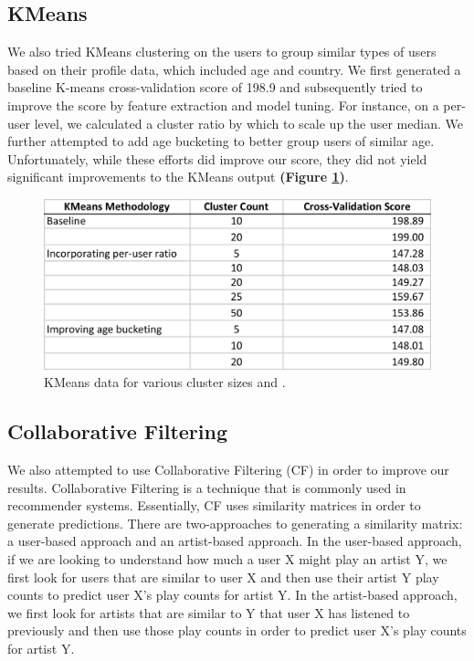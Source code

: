 \documentclass[11pt]{article}
\begin{document}
\subsection{KMeans}
We also tried KMeans clustering on the users to group similar types of users based on their profile data, which included age and country. We first generated a baseline K-means cross-validation score of 198.9 and subsequently tried to improve the score by feature extraction and model tuning. For instance, on a per-user level, we calculated a cluster ratio by which to scale up the user median. We further attempted to add age bucketing to better group users of similar age. Unfortunately, while these efforts did improve our score, they did not yield significant improvements to the KMeans output {\bf (Figure \ref{fig:kmeans_table})}.

 \begin{figure}[t]
    \centering
    \includegraphics[width=12cm]{kmeans_table}
    \caption{KMeans data for various cluster sizes and .}
    \label{fig:kmeans_table}
\end{figure}


\subsection{Collaborative Filtering}
We also attempted to use Collaborative Filtering (CF) in order to improve our results. Collaborative Filtering is a technique that is commonly used in recommender systems. Essentially, CF uses similarity matrices in order to generate predictions. There are two-approaches to generating a similarity matrix: a user-based approach and an artist-based approach. In the user-based approach, if we are looking to understand how much a user X might play an artist Y, we first look for users that are similar to user X and then use their artist Y play counts to predict user X's play counts for artist Y. In the artist-based approach, we first look for artists that are similar to Y that user X has listened to previously and then use those play counts in order to predict user X's play counts for artist Y.\\
\end{document}
